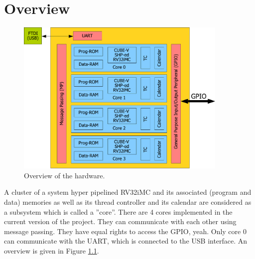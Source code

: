 \chapter{Overview}
\label{atomics}


\begin{figure}[!t]
	\centering
	\includegraphics[width=4in]{figs/overview}
	\caption{Overview of the hardware.}
	\label{overview}
\end{figure}


A cluster of a system hyper pipelined RV32iMC and its associated (program and data) memories as well as its thread controller and its calendar are considered as a subsystem which is called a ''core''. There are 4 cores implemented in the current version of the project. They can communicate with each other using message passing. They have equal rights to access the GPIO, yeah. Only core 0 can communicate with the UART, which is connected to the USB interface. An overview is given in Figure \ref{overview}.

